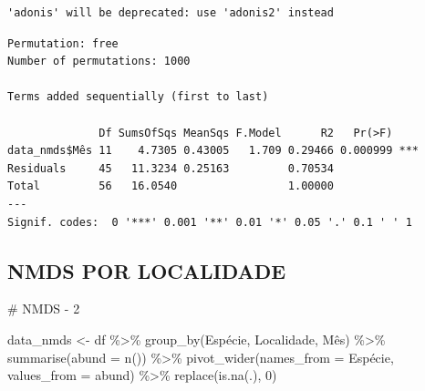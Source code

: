 \documentclass[
  letterpaper,
  DIV=11,
  numbers=noendperiod]{scrartcl}
\newenvironment{Shaded}{\begin{snugshade}}{\end{snugshade}}
\newcommand{\AttributeTok}[1]{\textcolor[rgb]{0.40,0.45,0.13}{#1}}
\newcommand{\CommentTok}[1]{\textcolor[rgb]{0.37,0.37,0.37}{#1}}
\newcommand{\DecValTok}[1]{\textcolor[rgb]{0.68,0.00,0.00}{#1}}
\newcommand{\FunctionTok}[1]{\textcolor[rgb]{0.28,0.35,0.67}{#1}}
\newcommand{\NormalTok}[1]{\textcolor[rgb]{0.00,0.23,0.31}{#1}}
\newcommand{\OtherTok}[1]{\textcolor[rgb]{0.00,0.23,0.31}{#1}}
\newcommand{\SpecialCharTok}[1]{\textcolor[rgb]{0.37,0.37,0.37}{#1}}
\begin{document}
\begin{Shaded}
\end{Shaded}

\begin{verbatim}
'adonis' will be deprecated: use 'adonis2' instead
\end{verbatim}

\begin{Shaded}
\end{Shaded}

\begin{verbatim}
Permutation: free
Number of permutations: 1000

Terms added sequentially (first to last)

              Df SumsOfSqs MeanSqs F.Model      R2   Pr(>F)    
data_nmds$Mês 11    4.7305 0.43005   1.709 0.29466 0.000999 ***
Residuals     45   11.3234 0.25163         0.70534             
Total         56   16.0540                 1.00000             
---
Signif. codes:  0 '***' 0.001 '**' 0.01 '*' 0.05 '.' 0.1 ' ' 1
\end{verbatim}

\hypertarget{nmds-por-localidade}{%
\subsection{NMDS POR LOCALIDADE}\label{nmds-por-localidade}}

\begin{Shaded}
\begin{Highlighting}[]
\CommentTok{\# NMDS {-} 2 }

\NormalTok{data\_nmds }\OtherTok{\textless{}{-}} 
\NormalTok{  df }\SpecialCharTok{\%\textgreater{}\%}
  \FunctionTok{group\_by}\NormalTok{(Espécie, Localidade, Mês) }\SpecialCharTok{\%\textgreater{}\%}
  \FunctionTok{summarise}\NormalTok{(}\AttributeTok{abund =} \FunctionTok{n}\NormalTok{()) }\SpecialCharTok{\%\textgreater{}\%}
  \FunctionTok{pivot\_wider}\NormalTok{(}\AttributeTok{names\_from =}\NormalTok{ Espécie, }\AttributeTok{values\_from =}\NormalTok{ abund) }\SpecialCharTok{\%\textgreater{}\%}
  \FunctionTok{replace}\NormalTok{(}\FunctionTok{is.na}\NormalTok{(.), }\DecValTok{0}\NormalTok{)}
\end{Highlighting}
\end{Shaded}
\end{document}
